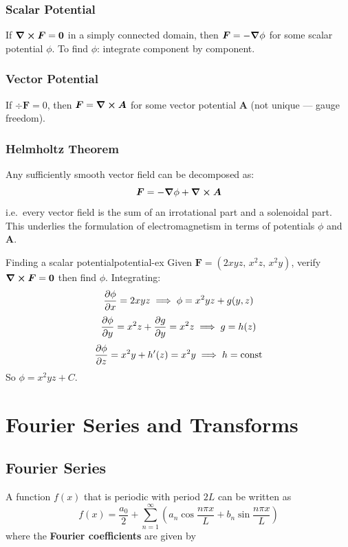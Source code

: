 \documentclass[11pt, letterpaper]{article}
\theoremstyle{plain}
\newcommand{\vv}[1]{\bm{#1}}
\begin{document}
\subsubsection*{Scalar Potential}
If $\curl\vv{F} = \vv{0}$ in a simply connected domain, then
$\vv{F} = -\grad\phi$ for some scalar potential $\phi$.
To find $\phi$: integrate component by component.

\subsubsection*{Vector Potential}
If $\div\vv{F} = 0$, then $\vv{F} = \curl\vv{A}$ for some vector
potential $\vv{A}$ (not unique — gauge freedom).

\subsubsection*{Helmholtz Theorem}
Any sufficiently smooth vector field can be decomposed as:
\[
    \vv{F} = -\grad\phi + \curl\vv{A}
\]
i.e.\ every vector field is the sum of an irrotational part and a
solenoidal part. This underlies the formulation of electromagnetism
in terms of potentials $\phi$ and $\vv{A}$.

\begin{example}{Finding a scalar potential}{potential-ex}
    Given $\vv{F} = (2xyz,\, x^2z,\, x^2y)$, verify $\curl\vv{F} = \vv{0}$
    then find $\phi$. Integrating:
    \[
        \pdv{\phi}{x} = 2xyz \implies \phi = x^2yz + g(y,z)
    \]
    \[
        \pdv{\phi}{y} = x^2z + \pdv{g}{y} = x^2z \implies g = h(z)
    \]
    \[
        \pdv{\phi}{z} = x^2y + h'(z) = x^2y \implies h = \text{const}
    \]
    So $\phi = x^2yz + C$.
\end{example}



\newpage
\section{Fourier Series and Transforms}        %
\begin{abstract}
    Problems involving vibrations or oscillations occur freuquently in physics and engineering. The Fourier series is a tool used to approximate periodic functions with sines and cosines.
\end{abstract}

\subsection{Fourier Series}
A function $f(x)$ that is periodic with period $2L$ can be written as 
\[
    f(x) = \frac{a_0}{2} + \sum_{n=1}^{\infty}
    \left( a_n \cos\frac{n\pi x}{L} + b_n \sin\frac{n\pi x}{L} \right)
\]
where the \textbf{Fourier coefficients} are given by 
\end{document}
